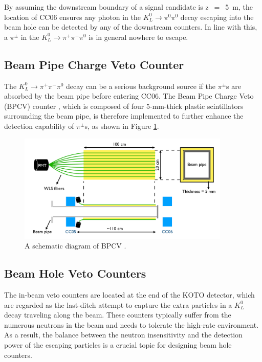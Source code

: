 By assuming the downstream boundary of a signal candidate is z~$=$~5~m, the location of CC06 ensures any photon in the ${K_L^0\to\pi^0\pi^0}$ decay escaping into the beam hole can be detected by any of the downstream counters. In line with this, a $\pi^{\pm}$ in the ${K_L^0\to\pi^+\pi^-\pi^0}$ is in general nowhere to escape.


\subsection{Beam Pipe Charge Veto Counter} 

The ${K_L^0\to\pi^+\pi^-\pi^0}$ decay can be a serious background source if the $\pi^{\pm}$s are absorbed by the beam pipe before entering CC06. The Beam Pipe Charge Veto (BPCV) counter \parencite{BPCV}, which is composed of four 5-mm-thick plastic scintillators surrounding the beam pipe, is therefore implemented to further enhance the detection capability of $\pi^{\pm}$s, as shown in Figure \ref{fig:BPCV}. 

\begin{figure}[H]
\begin{center}
\captionsetup{width=.99\linewidth}
\includegraphics[width=0.9\textwidth]{Figures/Chapter3/BPCV.pdf}
\caption{A schematic diagram of BPCV \parencite{BPCV}.}
\label{fig:BPCV}
\end{center}
\end{figure}

%
\subsection{Beam Hole Veto Counters}
\label{sec:beam_hole_counter}
The in-beam veto counters are located at the end of the KOTO detector, which are regarded as the last-ditch attempt to capture the extra particles in a $K_L^0$ decay traveling along the beam. These counters typically suffer from the numerous neutrons in the beam and needs to tolerate the high-rate environment. As a result, the balance between the neutron insensitivity and the detection power of the escaping particles is a crucial topic for designing beam hole counters.

